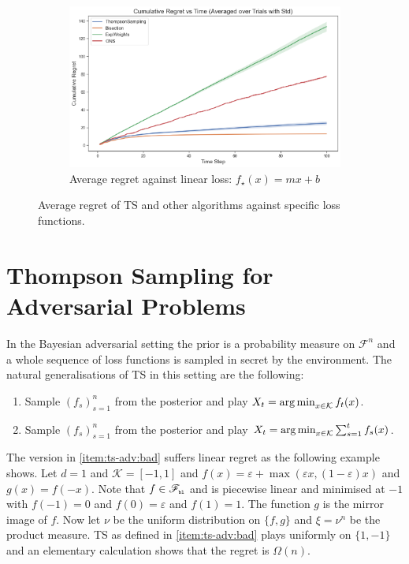 \documentclass[letter, 12pt]{report}
\newcommand{\pb}{\text{\tiny\texttt{b}}}
\newcommand{\pl}{\text{\tiny\texttt{l}}}
\newcommand{\argmin}{\operatornamewithlimits{arg\,min}}
\newcommand{\cK}{\mathcal K}
\newcommand{\sF}{\mathscr F}
\newcommand{\1}{\mathbf{1}}
\newcommand{\ts}{\textsc{TS}\xspace}
\renewcommand{\epsilon}{\varepsilon}
\theoremstyle{plain}
\theoremstyle{definition}
\theoremstyle{remark}
\begin{document}
\begin{figure}[h!]
    \vspace{0.5em}
    \begin{subfigure}{10cm}
        \centering
        \includegraphics[width=\textwidth]{figures/linear_reg.png}
        \caption{Average regret against linear loss: $f_\star(x) = mx + b$}
        \label{fig:linear-loss-regret}
    \end{subfigure}
    \caption{Average regret of \ts and other algorithms against specific loss functions.}
    \label{fig:specific-losses-reg}
\end{figure}


\chapter{Thompson Sampling for Adversarial Problems}
\label{ch:ts-adv}
In the Bayesian adversarial setting the prior is a probability measure on $\sF^n$ and a whole sequence of loss functions is sampled in secret
by the environment.
The natural generalisations of \ts{} in this setting are the following:
\begin{enumerate}
    \item Sample $(f_s)_{s=1}^n$ from the posterior and play $X_t = \argmin_{x \in \cK} f_t(x)$. \label{item:ts-adv:bad}
    \item Sample $(f_s)_{s=1}^n$ from the posterior and play $X_t = \argmin_{x \in \cK} \sum_{s=1}^t f_s(x)$. \label{item:ts-adv:ok}
\end{enumerate}
The version in \ref{item:ts-adv:bad} suffers linear regret as the following example shows.
Let $d = 1$ and $\cK = [-1,1]$ and $f(x) = \epsilon + \max(\epsilon x, (1 - \epsilon) x)$ and $g(x) = f(-x)$.
Note that $f \in \sF_{\pb\pl}$ and is piecewise linear and minimised at $-1$ with $f(-1) = 0$ and $f(0) = \epsilon$ and $f(1) = 1$.
The function $g$ is the mirror image of $f$.
Now let $\nu$ be the uniform distribution on $\{f, g\}$ and $\xi = \nu^n$ be the product measure.
\ts{} as defined in \ref{item:ts-adv:bad} plays uniformly on $\{1, -1\}$ and an elementary calculation shows that the regret
is $\Omega(n)$.
\end{document}
